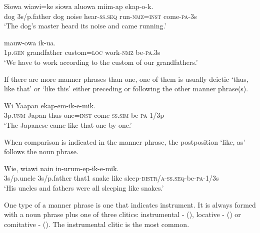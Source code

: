 \ea%
\label{ex:4:x882}
\gll Siowa  wiawi=ke  siowa  aluowa  miim-ap   ekap-o-k.\\
  dog  3s/p.father  dog  noise  hear-\textsc{ss}.\textsc{seq}  run-\textsc{nmz}=\textsc{inst}  come-\textsc{pa}-3s    \\
\glt`The dog's master heard its noise and came running.'
\z

\ea%
\label{ex:4:x884}
\gll {}    mauw-owa  ik-ua. \\
 1p.\textsc{gen}  grandfather  custom=\textsc{loc}  work-\textsc{nmz}  be-\textsc{pa}.3s     \\
\glt`We have to work according to the custom of our grandfathers.'
\z

If there are more manner phrases than one, one of them is usually deictic  `thus, like that' or  `like this' either preceding or following the other manner phrase(s).

\ea%
\label{ex:4:x883}
\gll Wi  Yaapan     ekap-em-ik-e-mik. \\
  3p.\textsc{unm}  Japan  thus  one=\textsc{inst}  come-\textsc{ss}.\textsc{sim}-be-\textsc{pa}-1/3p    \\
\glt`The Japanese came like that one by one.'
\z

When comparison is indicated in the manner phrase, the postposition  `like, as' follows the noun phrase.

\ea%
\label{ex:4:x885}
\gll Wie,  wiawi  nain    in-urum-ep-ik-e-mik.\\
  3s/p.uncle  3s/p.father  that1  snake  like  sleep-\textsc{distr}/\textsc{a}-\textsc{ss}.\textsc{seq}-be-\textsc{pa}-1/3s    \\
\glt`His uncles and fathers were all sleeping like snakes.'
\z

One type of a manner phrase is one that indicates instrument.  It is always formed with a noun phrase plus one of three clitics: instrumental -\textstyleStyleVernacularWordsItalic{} (), locative -  ()\textstyleStyleVernacularWordsItalic{} or comitative -\textstyleStyleVernacularWordsItalic{} (). The instrumental clitic is the most common. 

